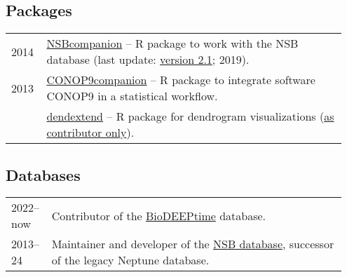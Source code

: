 \documentclass[11pt, a4paper]{article}
\begin{document}
\subsection{Packages}
\begin{longtable}{@{}p{0.1\linewidth} >{\small}P{0.85\linewidth}@{}}
2014 & \href{http://github.com/plannapus/NSBcompanion}{NSBcompanion} -- R package to work with the NSB database (last update: \href{http://doi.org/10.5281/zenodo.3408198}{version 2.1}; 2019).\\
2013 & \href{http://github.com/plannapus/CONOP9companion}{CONOP9companion} -- R package to integrate software CONOP9 in a statistical workflow.\\
     & \href{https://cran.r-project.org/web/packages/dendextend/index.html}{dendextend} -- R package for dendrogram visualizations (\underline{as contributor only}).\\
\end{longtable}
\subsection{Databases}
\begin{longtable}{@{}p{0.1\linewidth} >{\small}P{0.85\linewidth}@{}}
2022--now & Contributor of the \href{https://zenodo.org/record/7504616}{BioDEEPtime} database.\\
2013--24 & Maintainer and developer of the \href{https://web.archive.org/web/20230925131822/https://nsb.mfn-berlin.de/}{NSB database}, successor of the legacy Neptune database.\\
\end{longtable}
\end{document}
